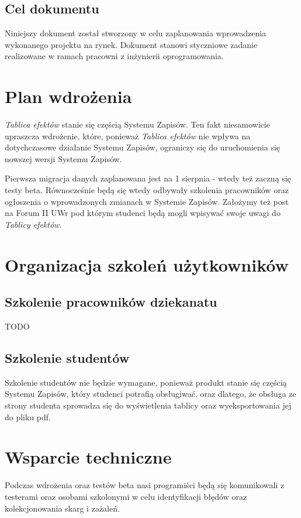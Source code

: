 \documentclass{article}
\begin{document}
\subsection{Cel dokumentu}
Niniejszy dokument został stworzony w celu zaplanowania wprowadzenia wykonanego projektu na rynek.
Dokument stanowi styczniowe zadanie realizowane w ramach pracowni z inżynierii oprogramowania.


\section{Plan wdrożenia}
\textit{Tablica efektów} stanie się częścią Systemu Zapisów.
Ten fakt niesamowicie upraszcza wdrożenie, które, ponieważ \textit{Tablica efektów} nie wpływa na dotychczasowe działanie Systemu Zapisów, ograniczy się do uruchomienia się nowszej wersji Systemu Zapisów.

Pierwsza migracja danych zaplanowana jest na 1 sierpnia - wtedy też zaczną się testy beta. Równocześnie będą się wtedy odbywały szkolenia pracowników oraz ogłoszenia o wprowadzonych
zmianach w Systemie Zapisów. Założymy też post na Forum II UWr pod którym studenci będą mogli wpisywać swoje uwagi do \textit{Tablicy efektów}.

\section{Organizacja szkoleń użytkowników}

\subsection{Szkolenie pracowników dziekanatu}
TODO

\subsection{Szkolenie studentów}
Szkolenie studentów nie będzie wymagane, ponieważ produkt stanie się częścią Systemu Zapisów, który studenci potrafią obsługiwać, oraz dlatego, że obsługa ze strony studenta sprowadza się do wyświetlenia tablicy oraz wyeksportowania jej do pliku pdf.

\section{Wsparcie techniczne}
Podczas wdrożenia oraz testów beta nasi programiści będą się komunikowali z testerami oraz osobami szkolonymi w celu identyfikacji błędów oraz kolekcjonowania skarg i zażaleń.
\end{document}
